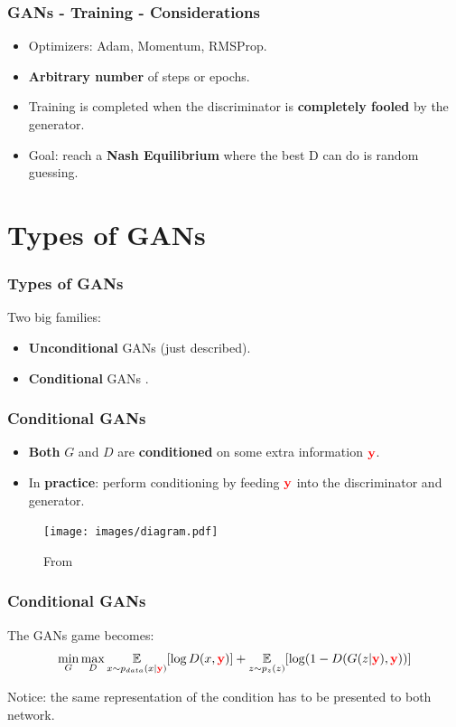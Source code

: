 \documentclass{beamer}
\begin{document}
\begin{frame}
\frametitle{GANs - Training - Considerations}
\begin{itemize}
\item Optimizers: Adam, Momentum, RMSProp.
\item \textbf{Arbitrary number} of steps or epochs.
\item Training is completed when the discriminator is \textbf{completely fooled} by the generator.
\item Goal: reach a \textbf{Nash Equilibrium} where the best D can do is random guessing.
\end{itemize}
\end{frame}

\section{Types of GANs}

\begin{frame}
\frametitle{Types of GANs}
Two big families:
\begin{itemize}
\item \textbf{Unconditional} GANs (just described).
\item \textbf{Conditional} GANs \citep{mirzaConditionalGenerativeAdversarial2014}.
\end{itemize}
\end{frame}

\begin{frame}
\frametitle{Conditional GANs}
\begin{itemize}
\item \textbf{Both} $G$ and $D$ are \textbf{conditioned} on some extra information $ \color{red} \mathbf{y}$.
\item In \textbf{practice}:  perform conditioning by feeding $\color{red} \mathbf{y}$ into the discriminator and generator.
\end{itemize}
\vspace{-1cm}
\begin{figure}
\texttt{[image: images/diagram.pdf]}
\vspace{-1cm}
\caption{From \cite{mirzaConditionalGenerativeAdversarial2014}}
\end{figure}
\end{frame}

\begin{frame}
\frametitle{Conditional GANs}
The GANs game becomes:
$$ 
\min_G \max_D \underset{x \sim p_{data}(x| \textcolor{red}{\mathbf{y}})}{\mathbb{E}} [\log D(x, \textcolor{red}{\mathbf{y}})]  +\underset{z \sim p_z(z)}{\mathbb{E}}[\log(1 - D(G(z|\textcolor{red}{\mathbf{y}}),\textcolor{red}{\mathbf{y}}))]
$$

\begin{block}{}
Notice: the same representation of the condition has to be presented to both network.
\end{block}
\end{frame}
\end{document}
